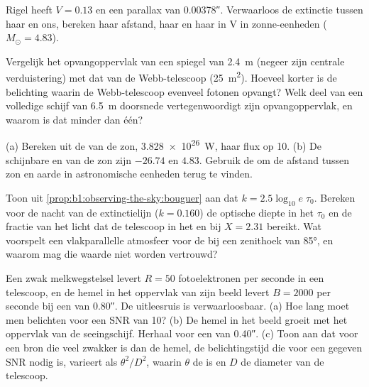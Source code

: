 \begin{exercise}[$\star\star$]\label{exo:b1:observing-the-sky:7}
Rigel heeft $V = 0.13$ en een parallax van \ang{;;0.00378}. Verwaarloos de extinctie tussen haar en
ons, bereken haar afstand, haar  en haar  in V in
zonne-eenheden ($M_\odot = 4.83$).
\end{exercise}

\begin{exercise}[$\star\star$]\label{exo:b1:observing-the-sky:8}
Vergelijk het opvangoppervlak van een spiegel van \qty{2.4}{m} (negeer zijn centrale
verduistering) met dat van de Webb-telescoop (\qty{25}{m^2}). Hoeveel korter is de belichting
waarin de Webb-telescoop evenveel fotonen opvangt? Welk deel van een volledige schijf van
\qty{6.5}{m} doorsnede vertegenwoordigt zijn opvangoppervlak, en waarom is dat minder dan één?
\end{exercise}

\begin{exercise}[$\star\star$]\label{exo:b1:observing-the-sky:9}
(a) Bereken uit de  van de zon, \qty{3.828e26}{W}, haar flux op \qty{10}{\parsec}.
(b) De schijnbare en  van de zon zijn $-26.74$ en $4.83$. Gebruik de
 om de afstand tussen zon en aarde in astronomische eenheden terug te vinden.
\end{exercise}

\begin{exercise}[$\star\star\star$]\label{exo:b1:observing-the-sky:10}
Toon uit \cref{prop:b1:observing-the-sky:bouguer} aan dat $k =
2.5\log_{10}e\;\tau_0$. Bereken voor de nacht van de extinctielijn ($k =
\num{0.160}$) de optische diepte in het  $\tau_0$ en de fractie van het licht dat
de telescoop in het  en bij $X = 2.31$ bereikt. Wat voorspelt een vlakparallelle
atmosfeer voor de  bij een zenithoek van \ang{85}, en waarom mag die waarde
niet worden vertrouwd?
\end{exercise}

\begin{exercise}[$\star\star\star$]\label{exo:b1:observing-the-sky:11}
Een zwak melkwegstelsel levert $R = 50$ fotoelektronen per seconde in een telescoop, en de
hemel in het oppervlak van zijn beeld levert $B = \num{2000}$ per seconde bij een  van
\ang{;;0.80}. De uitleesruis is verwaarloosbaar. (a) Hoe lang moet men belichten voor een SNR
van 10? (b) De hemel in het beeld groeit met het oppervlak van de seeingschijf. Herhaal voor een
 van \ang{;;0.40}. (c) Toon aan dat voor een bron die veel zwakker is dan de hemel, de
belichtingstijd die voor een gegeven SNR nodig is, varieert als $\theta^2/D^2$, waarin $\theta$ de
 is en $D$ de diameter van de telescoop.
\end{exercise}

